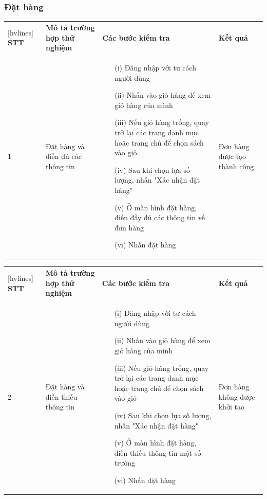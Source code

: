\documentclass[../DoAn.tex]{subfiles}
\begin{document}
\subsubsection{Đặt hàng}
\begin{NiceTabular}[width=1\linewidth]{X[1,l]X[2,l]X[5,l]X[3,l]}[hvlines]
\textbf{STT} & \textbf{Mô tả trường hợp thử nghiệm} & \textbf{Các bước kiểm tra} & \textbf{Kết quả} \\
1 & Đặt hàng và điền đủ các thông tin
& \begin{enumerate}
    \item[(i)] Đăng nhập với tư cách người dùng
    \item[(ii)] Nhấn vào giỏ hàng để xem giỏ hàng của mình
    \item[(iii)] Nếu giỏ hàng trống, quay trở lại các trang danh mục hoặc
    trang chủ để chọn sách vào giỏ
    \item[(iv)] Sau khi chọn lựa số lượng, nhấn "Xác nhận đặt hàng"
    \item[(v)] Ở màn hình đặt hàng, điền đầy đủ các thông tin về đơn hàng
    \item[(vi)] Nhấn đặt hàng
\end{enumerate}
 & Đơn hàng được tạo thành công  \\   
\end{NiceTabular}

\begin{NiceTabular}[width=1\linewidth]{X[1,l]X[2,l]X[5,l]X[3,l]}[hvlines]
\textbf{STT} & \textbf{Mô tả trường hợp thử nghiệm} & \textbf{Các bước kiểm tra} & \textbf{Kết quả} \\
2 & Đặt hàng và điền thiếu thông tin
& \begin{enumerate}
    \item[(i)] Đăng nhập với tư cách người dùng
    \item[(ii)] Nhấn vào giỏ hàng để xem giỏ hàng của mình
    \item[(iii)] Nếu giỏ hàng trống, quay trở lại các trang danh mục hoặc
    trang chủ để chọn sách vào giỏ
    \item[(iv)] Sau khi chọn lựa số lượng, nhấn "Xác nhận đặt hàng"
    \item[(v)] Ở màn hình đặt hàng, điền thiếu thông tin một số trường
    \item[(vi)] Nhấn đặt hàng
\end{enumerate}
 & Đơn hàng không được khởi tạo  \\   
\end{NiceTabular}
\end{document}
